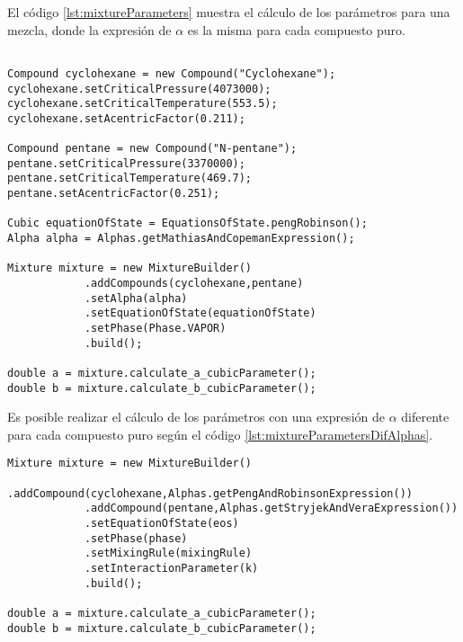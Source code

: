 El código \ref{lst:mixtureParameters} muestra el cálculo de los parámetros para una mezcla, donde la expresión de $\alpha$ es la misma para cada compuesto puro. 

\begin{lstlisting}[caption={Código para el cálculo de los parámetros de la ecuación de estado en una mezcla.}, label={lst:mixtureParameters} ]

Compound cyclohexane = new Compound("Cyclohexane");
cyclohexane.setCriticalPressure(4073000);
cyclohexane.setCriticalTemperature(553.5);
cyclohexane.setAcentricFactor(0.211);

Compound pentane = new Compound("N-pentane");
pentane.setCriticalPressure(3370000);
pentane.setCriticalTemperature(469.7);
pentane.setAcentricFactor(0.251);

Cubic equationOfState = EquationsOfState.pengRobinson();
Alpha alpha = Alphas.getMathiasAndCopemanExpression();

Mixture mixture = new MixtureBuilder()
			.addCompounds(cyclohexane,pentane)
			.setAlpha(alpha)
			.setEquationOfState(equationOfState)
			.setPhase(Phase.VAPOR)
			.build();

double a = mixture.calculate_a_cubicParameter();
double b = mixture.calculate_b_cubicParameter();
\end{lstlisting}

Es posible realizar el cálculo de los parámetros con una expresión de $\alpha$ diferente para cada compuesto puro según el código \ref{lst:mixtureParametersDifAlphas}. 


\begin{lstlisting}[caption={Código para el cálculo de los parámetros de la ecuación de estado en una mezcla, con diferentes expresiones de $\alpha$},label={lst:mixtureParametersDifAlphas}]
Mixture mixture = new MixtureBuilder()
			.addCompound(cyclohexane,Alphas.getPengAndRobinsonExpression())
			.addCompound(pentane,Alphas.getStryjekAndVeraExpression())
			.setEquationOfState(eos)
			.setPhase(phase)
			.setMixingRule(mixingRule)
			.setInteractionParameter(k)
			.build();

double a = mixture.calculate_a_cubicParameter();
double b = mixture.calculate_b_cubicParameter();
\end{lstlisting}
